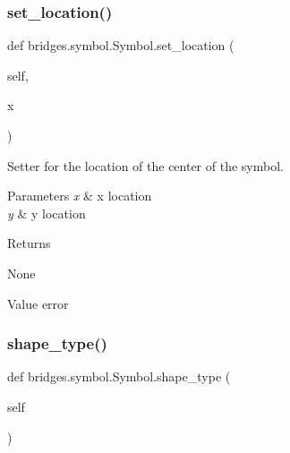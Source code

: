 \mbox{\label{classbridges_1_1symbol_1_1_symbol_a616aeca9f529ed61300e92e63cbbaf99}} 
\subsubsection{\texorpdfstring{set\+\_\+location()}{set\_location()}}
{\footnotesize\ttfamily def bridges.\+symbol.\+Symbol.\+set\+\_\+location (\begin{DoxyParamCaption}\item[{}]{self,  }\item[{}]{x }\end{DoxyParamCaption})}



Setter for the location of the center of the symbol. 


\begin{DoxyParams}{Parameters}
{\em x} & x location \\
\hline
{\em y} & y location \\
\hline
\end{DoxyParams}
\begin{DoxyReturn}{Returns}


None \begin{DoxyVerb}       Value error\end{DoxyVerb}
 
\end{DoxyReturn}
\mbox{\label{classbridges_1_1symbol_1_1_symbol_a86813f0f1a7ecbe5c52725730c887e75}} 
\subsubsection{\texorpdfstring{shape\+\_\+type()}{shape\_type()}\hspace{0.1cm}{\footnotesize\ttfamily [1/2]}}
{\footnotesize\ttfamily def bridges.\+symbol.\+Symbol.\+shape\+\_\+type (\begin{DoxyParamCaption}\item[{}]{self }\end{DoxyParamCaption})}

